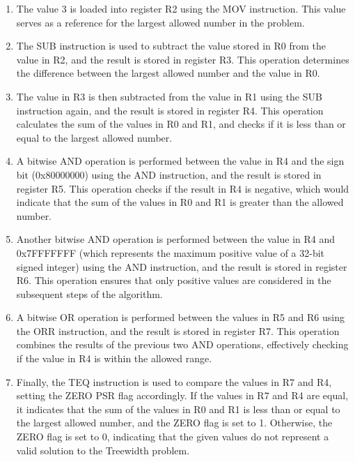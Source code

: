 \begin{enumerate}
    \item The value 3 is loaded into register R2 using the MOV instruction. This value serves as a reference for the largest allowed number in the problem.
    
    \item The SUB instruction is used to subtract the value stored in R0 from the value in R2, and the result is stored in register R3. This operation determines the difference between the largest allowed number and the value in R0.
    
    \item The value in R3 is then subtracted from the value in R1 using the SUB instruction again, and the result is stored in register R4. This operation calculates the sum of the values in R0 and R1, and checks if it is less than or equal to the largest allowed number.
    
    \item A bitwise AND operation is performed between the value in R4 and the sign bit (0x80000000) using the AND instruction, and the result is stored in register R5. This operation checks if the result in R4 is negative, which would indicate that the sum of the values in R0 and R1 is greater than the allowed number.
    
    \item Another bitwise AND operation is performed between the value in R4 and 0x7FFFFFFF (which represents the maximum positive value of a 32-bit signed integer) using the AND instruction, and the result is stored in register R6. This operation ensures that only positive values are considered in the subsequent steps of the algorithm.
    
    \item A bitwise OR operation is performed between the values in R5 and R6 using the ORR instruction, and the result is stored in register R7. This operation combines the results of the previous two AND operations, effectively checking if the value in R4 is within the allowed range.
    
    \item Finally, the TEQ instruction is used to compare the values in R7 and R4, setting the ZERO PSR flag accordingly. If the values in R7 and R4 are equal, it indicates that the sum of the values in R0 and R1 is less than or equal to the largest allowed number, and the ZERO flag is set to 1. Otherwise, the ZERO flag is set to 0, indicating that the given values do not represent a valid solution to the Treewidth problem.
\end{enumerate}

